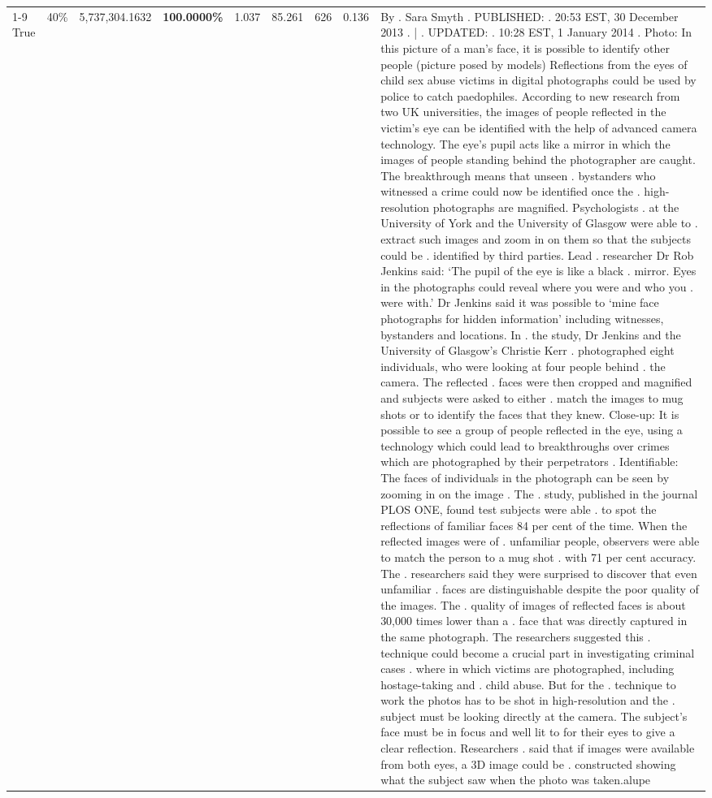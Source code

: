 \begin{table}[H]
\begin{tabular}{lllrlllll}
\cline{1-9} \cline{2-9}
True & 40\% & 5,737,304.1632 & \bfseries \color{red} 100.0000\% & 1.037 & 85.261 & 626 & 0.136 & By . Sara Smyth . PUBLISHED: . 20:53 EST, 30 December 2013 . | . UPDATED: . 10:28 EST, 1 January 2014 . Photo: In this picture of a man's face, it is possible to identify other people (picture posed by models) Reflections from the eyes of child sex abuse victims in digital photographs could be used by police to catch paedophiles. According to new research from two UK universities, the images of people reflected in the victim's eye can be identified with the help of advanced camera technology. The eye's pupil acts like a mirror in which the images of people standing behind the photographer are caught. The breakthrough means that unseen . bystanders who witnessed a crime could now be identified once the . high-resolution photographs are magnified. Psychologists . at the University of York and the University of Glasgow were able to . extract such images and zoom in on them so that the subjects could be . identified by third parties. Lead . researcher Dr Rob Jenkins said: ‘The pupil of the eye is like a black . mirror. Eyes in the photographs could reveal where you were and who you . were with.' Dr Jenkins said it was possible to ‘mine face photographs for hidden information' including witnesses, bystanders and locations. In . the study, Dr Jenkins and the University of Glasgow's Christie Kerr . photographed eight individuals, who were looking at four people behind . the camera. The reflected . faces were then cropped and magnified and subjects were asked to either . match the images to mug shots or to identify the faces that they knew. Close-up: It is possible to see a group of people reflected in the eye, using a technology which could lead to breakthroughs over crimes which are photographed by their perpetrators . Identifiable: The faces of individuals in the photograph can be seen by zooming in on the image . The . study, published in the journal PLOS ONE, found test subjects were able . to spot the reflections of familiar faces 84 per cent of the time. When the reflected images were of . unfamiliar people, observers were able to match the person to a mug shot . with 71 per cent accuracy. The . researchers said they were surprised to discover that even unfamiliar . faces are distinguishable despite the poor quality of the images. The . quality of images of reflected faces is about 30,000 times lower than a . face that was directly captured in the same photograph. The researchers suggested this . technique could become a crucial part in investigating criminal cases . where in which victims are photographed, including hostage-taking and . child abuse. But for the . technique to work the photos has to be shot in high-resolution and the . subject must be looking directly at the camera. The subject's face must be in focus and well lit to for their eyes to give a clear reflection. Researchers . said that if images were available from both eyes, a 3D image could be . constructed showing what the subject saw when the photo was taken.alupe \\

\end{tabular}
\end{table}
